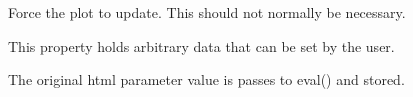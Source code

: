 \documentclass[letterpaper,10pt,english]{sphinxmanual}
\begin{document}
\begin{fulllineitems}
\begin{fulllineitems}
\label{api:mpl.Chart2D.update}
Force the plot to update. This should not normally be necessary.

\end{fulllineitems}


\begin{fulllineitems}
\label{api:mpl.Chart2D.user}
This property holds arbitrary data that can be set by the user.

The original html parameter value is passes to eval() and stored.

\end{fulllineitems}


\end{fulllineitems}

\end{document}
